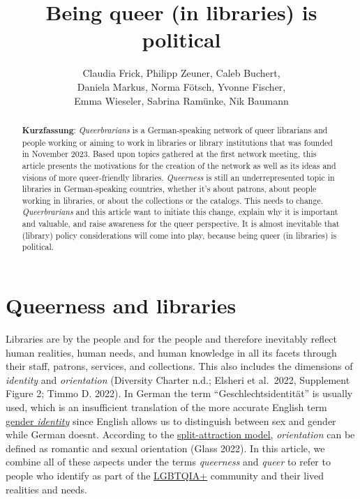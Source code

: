 \documentclass[a4paper,
fontsize=11pt,
oneside,
numbers=noperiodatend,
parskip=half-,
bibliography=totoc,
final
]{scrartcl}
\title{\LARGE{Being queer (in libraries) is political}}%
\author{Claudia Frick, Philipp Zeuner, Caleb Buchert,\\ Daniela Markus, Norma Fötsch, Yvonne Fischer,\\ Emma Wieseler, Sabrina Ramünke, Nik Baumann} %
\date{}
\begin{document}
\maketitle
\thispagestyle{fancyplain} 

\begin{abstract}
\noindent
\textbf{Kurzfassung}: \textit{Queerbrarians} is a German-speaking network of
queer librarians and people working or aiming to work in libraries or
library institutions that was founded in November 2023. Based upon
topics gathered at the first network meeting, this article presents the
motivations for the creation of the network as well as its ideas and
visions of more queer-friendly libraries. \textit{Queerness} is still an
underrepresented topic in libraries in German-speaking countries,
whether it's about patrons, about people working in libraries, or about
the collections or the catalogs. This needs to change. \textit{Queerbrarians} and
this article want to initiate this change, explain why it is important
and valuable, and raise awareness for the queer perspective. It is
almost inevitable that (library) policy considerations will come into
play, because being queer (in libraries) is political.
\end{abstract}

\hypertarget{queerness-and-libraries}{%
\section{Queerness and libraries}\label{queerness-and-libraries}}

Libraries are by the people and for the people and therefore inevitably
reflect human realities, human needs, and human knowledge in all its
facets through their staff, patrons, services, and collections. This
also includes the dimensions of \emph{identity} and \emph{orientation}
(Diversity Charter n.d.; Elsheri et al.~2022, Supplement Figure 2; Timmo
D. 2022). In German the term
\enquote{Geschlechtsidentität} is usually used,
which is an insufficient translation of the more accurate English term
\href{https://lgbtqia.fandom.com/wiki/Gender\_identity}{gender \textit{identity}}
since English allows us to distinguish between sex and gender while
German doesn\textquotesingle t. According to the
\href{https://lgbtqia.mywikis.wiki/wiki/Split_Attraction_Model}{split-attraction
model}, \emph{orientation} can be defined as romantic and sexual
orientation (Glass 2022). In this article, we combine all of these
aspects under the terms \emph{queerness} and \emph{queer} to refer to
people who identify as part of the
\href{https://lgbtqia.mywikis.wiki/wiki/LGBT}{LGBTQIA+} community and
their lived realities and needs.
\end{document}
